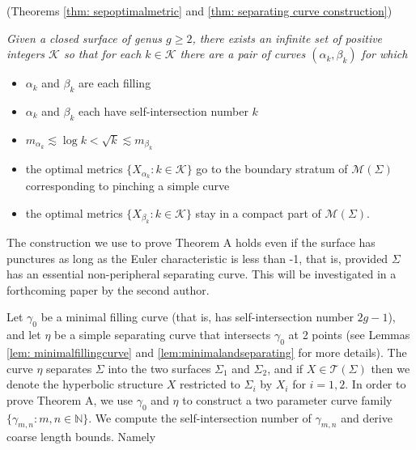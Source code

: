 \documentclass[12pt]{amsart}
\numberwithin{equation}{section}
\theoremstyle{plain}
\begin{document}
\vskip5pt
 (Theorems \ref{thm: sepoptimalmetric} and \ref{thm: separating curve construction})
{\it  Given a  closed surface of genus $g \geq 2$,  there exists an  infinite set of positive integers
 $\mathcal{K}$ so that for each 
 $k \in \mathcal{K}$  there are  a  pair of  curves 
 $(\alpha_{k}, \beta_{k})$ for which 
\begin{itemize}
\item $\alpha_{k}$ and $\beta_{k}$ are each  filling
\item  $\alpha_{k}$ and $\beta_{k}$  each have   self-intersection number $k$
\item  $m_{\alpha_k}\lesssim \log k < \sqrt{k}\lesssim  m_{\beta_k}$
\item the optimal metrics $\{X_{\alpha_{k}}: {k \in \mathcal{K}}\}$ go to the boundary stratum of 
$\mathcal{M}(\Sigma)$ corresponding to pinching   a  simple curve 
\item the optimal metrics $\{X_{\beta_{k}}: {k \in \mathcal{K}} \}$ stay in a compact part of $\mathcal{M}(\Sigma)$. \end{itemize}}




The construction we use to prove  Theorem A holds even if the surface has punctures as long as the Euler characteristic is less than -1, that is,  provided $\Sigma$ has an essential non-peripheral separating curve.  This will be investigated in a forthcoming paper by the second author.



Let $\gamma_{0}$ be a minimal filling curve (that is,
has self-intersection number $2g-1$), and let $\eta$ be a simple separating curve that intersects $\gamma_{0}$ at 2 points (see Lemmas 
\ref{lem: minimalfillingcurve} and \ref{lem:minimalandseparating} for more details). 
The curve $\eta$ separates $\Sigma$ into the two surfaces $\Sigma_{1}$ and $\Sigma_{2}$, and  
if $X \in \mathcal{T}(\Sigma)$ then we denote  the hyperbolic structure $X$ restricted to $\Sigma_{i}$ by 
$X_{i}$ for $i=1,2$.
In order to prove Theorem A,
we use $\gamma_{0}$ and $\eta$ to  construct a two  parameter curve family 
$\{\gamma_{m,n} :m,n \in \mathbb{N}\}$. 
We compute the self-intersection number of $\gamma_{m,n}$ and derive coarse length bounds. Namely
\end{document}
